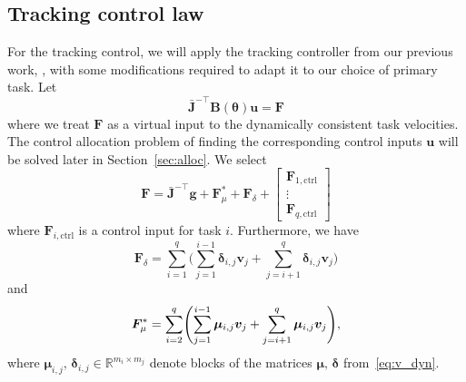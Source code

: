 \documentclass[../main.tex]{subfiles}
\begin{document}




\subsection{Tracking control law}
For the tracking control, we will apply the tracking controller from our previous work, \cite{Saeboe2022}, with some modifications required to adapt it to our choice of primary task. %
Let 
\begin{equation}\label{eq:JBu}
    \bar{\bm{J}}^{-\top} \bm{B} (\bm{\theta} ) \bm{u}  = \bm{F} 
\end{equation}
where we treat $\bm{F}$ as a virtual input to the dynamically consistent task velocities. The control allocation problem of finding the corresponding  control inputs $\bm{u}$ will be solved later in Section~\ref{sec:alloc}. We select
\begin{equation}\label{eq:F}
    \bm{F} = \bar{\bm{J}}^{-\top} \bm{g} + \bm{F}^*_{\mu} + \bm{F}_{\delta} + \left[ \begin{smallmatrix}
        \bm{F}_{1,\textrm{ctrl}} \\ \vdots \\ \bm{F}_{q,\textrm{ctrl}}
    \end{smallmatrix}\right]
\end{equation}
where $\bm{F}_{i,\textrm{ctrl}}$ is a control input for task $i$. Furthermore, we have
\begin{equation}\label{eq:Fdelta}
    \bm{F}_{\delta} = \sum^{q}_{i=1} \Biggl( \sum_{j=1}^{i-1} \bm{\delta}_{i,j} \bm{v}_j + \sum_{j=i+1}^{q} \bm{\delta}_{i,j} \bm{v}_j  \Biggr)
\end{equation}
and\vspace{3pt}
\begin{equation}\label{eq:F*mu}
    \bm{F}^*_{\mu} = \sum^{q}_{i=2} \Biggl( \sum_{j=1}^{i-1} \bm{\mu}_{i,j} \bm{v}_j + \sum_{j=i+1}^{q} \bm{\mu}_{i,j} \bm{v}_j   \Biggr) ,\vspace{3pt}
\end{equation}
%
where $\bm{\mu}_{i,j},\, \bm{\delta}_{i,j} \in \mathbb{R}^{m_i \times m_j}$ denote blocks of the matrices $\bm{\mu},\, \bm{\delta}$ from~\eqref{eq:v_dyn}.
\end{document}
